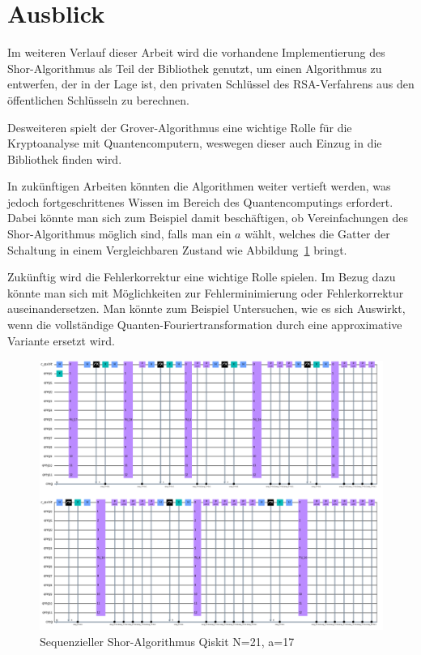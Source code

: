 \documentclass[a4paper,journal]{IEEEtran}
\begin{document}
\section{Ausblick}
Im weiteren Verlauf dieser Arbeit wird die vorhandene Implementierung des Shor-Algorithmus
als Teil der Bibliothek genutzt,
um einen Algorithmus zu entwerfen, der in der Lage ist,
den privaten Schlüssel des RSA-Verfahrens aus den öffentlichen Schlüsseln zu berechnen.

Desweiteren spielt der Grover-Algorithmus eine wichtige Rolle für die Kryptoanalyse mit Quantencomputern,
weswegen dieser auch Einzug in die Bibliothek finden wird.

In zukünftigen Arbeiten könnten die Algorithmen weiter vertieft werden,
was jedoch fortgeschrittenes Wissen im Bereich des Quantencomputings erfordert.
Dabei könnte man sich zum Beispiel damit beschäftigen,
ob Vereinfachungen des Shor-Algorithmus möglich sind, falls man ein \(a\) wählt,
welches die Gatter der Schaltung in einem Vergleichbaren Zustand wie Abbildung~\ref{fig:QiskitN1a17} bringt.

Zukünftig wird die Fehlerkorrektur eine wichtige Rolle spielen.
Im Bezug dazu könnte man sich mit Möglichkeiten zur Fehlerminimierung oder Fehlerkorrektur auseinandersetzen.
Man könnte zum Beispiel Untersuchen, wie es sich Auswirkt,
wenn die vollständige Quanten-Fouriertransformation durch eine approximative Variante ersetzt wird.

\begin{figure}[p]
\centering
\caption{Sequenzieller Shor-Algorithmus Qiskit N=21, a=17}
\label{fig:QiskitN1a17}
\includegraphics[height=\linewidth,angle=90]{qiskit_Shor_21_a17.PNG}
\end{figure}
\end{document}
